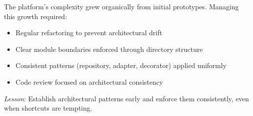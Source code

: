 The platform's complexity grew organically from initial prototypes. Managing this growth required:

\begin{itemize}
    \item Regular refactoring to prevent architectural drift
    \item Clear module boundaries enforced through directory structure
    \item Consistent patterns (repository, adapter, decorator) applied uniformly
    \item Code review focused on architectural consistency
\end{itemize}

\textit{Lesson}: Establish architectural patterns early and enforce them consistently, even when shortcuts are tempting.

